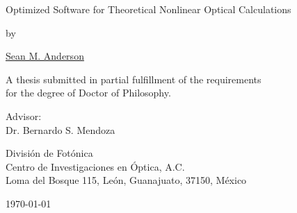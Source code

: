 \begin{titlingpage}
\begin{center}
\vspace*{2cm}
{\Huge Optimized Software for Theoretical Nonlinear Optical Calculations}
\vspace{1.0cm}

{\large by}
\vspace{1.0cm}

{\LARGE \href{mailto:sean.martin.anderson@gmail.com}{Sean M. Anderson}}
\vspace{3cm}

{\Large A thesis submitted in partial fulfillment of the requirements\\
\vspace{0.25cm}
for the degree of Doctor of Philosophy.}
\vspace{4cm}

{\large Advisor:\\
Dr. Bernardo S. Mendoza
\vspace*{1cm}

Divisi\'on de Fot\'onica\\
Centro de Investigaciones en \'Optica, A.C.\\
Loma del Bosque 115, Le\'on, Guanajuato, 37150, M\'exico}
\vfill
\today
\end{center}
\end{titlingpage}
